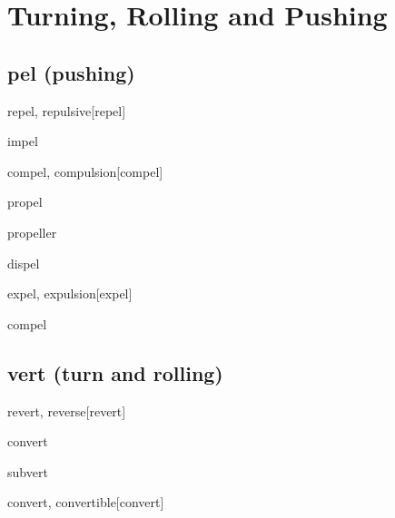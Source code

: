 \chapter{Turning, Rolling and Pushing}

\section{pel (pushing)}

\begin{RefWord}{repel, repulsive}[repel]
\end{RefWord}

\begin{RefWord}{impel}
\end{RefWord}

\begin{RefWord}{compel,  compulsion}[compel]
\end{RefWord}

\begin{RefWord}{propel}
 \end{RefWord}


\begin{RefWord}{propeller}
\end{RefWord}

\begin{RefWord}{dispel}
\end{RefWord}

\begin{RefWord}{expel, expulsion}[expel]
\end{RefWord}

\begin{RefWord}{compel}
\end{RefWord}



\section{vert (turn and rolling)}

\begin{RefWord}{revert, reverse}[revert]
\end{RefWord}

\begin{RefWord}{convert}
\end{RefWord}

\begin{RefWord}{subvert}
\end{RefWord}

\begin{RefWord}{convert, convertible}[convert]
\end{RefWord}

